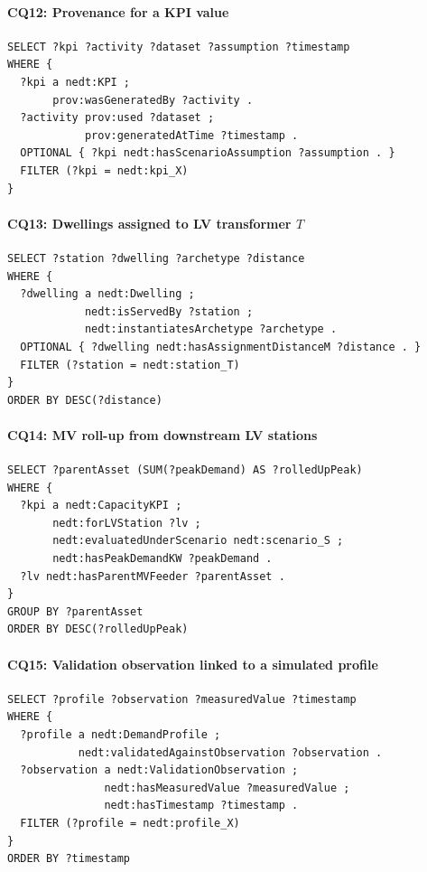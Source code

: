 \documentclass[preprint,12pt]{elsarticle}
\begin{document}
\paragraph{CQ12: Provenance for a KPI value}
\begin{verbatim}
SELECT ?kpi ?activity ?dataset ?assumption ?timestamp
WHERE {
  ?kpi a nedt:KPI ;
       prov:wasGeneratedBy ?activity .
  ?activity prov:used ?dataset ;
            prov:generatedAtTime ?timestamp .
  OPTIONAL { ?kpi nedt:hasScenarioAssumption ?assumption . }
  FILTER (?kpi = nedt:kpi_X)
}
\end{verbatim}

\paragraph{CQ13: Dwellings assigned to LV transformer $T$}
\begin{verbatim}
SELECT ?station ?dwelling ?archetype ?distance
WHERE {
  ?dwelling a nedt:Dwelling ;
            nedt:isServedBy ?station ;
            nedt:instantiatesArchetype ?archetype .
  OPTIONAL { ?dwelling nedt:hasAssignmentDistanceM ?distance . }
  FILTER (?station = nedt:station_T)
}
ORDER BY DESC(?distance)
\end{verbatim}

\paragraph{CQ14: MV roll-up from downstream LV stations}
\begin{verbatim}
SELECT ?parentAsset (SUM(?peakDemand) AS ?rolledUpPeak)
WHERE {
  ?kpi a nedt:CapacityKPI ;
       nedt:forLVStation ?lv ;
       nedt:evaluatedUnderScenario nedt:scenario_S ;
       nedt:hasPeakDemandKW ?peakDemand .
  ?lv nedt:hasParentMVFeeder ?parentAsset .
}
GROUP BY ?parentAsset
ORDER BY DESC(?rolledUpPeak)
\end{verbatim}

\paragraph{CQ15: Validation observation linked to a simulated profile}
\begin{verbatim}
SELECT ?profile ?observation ?measuredValue ?timestamp
WHERE {
  ?profile a nedt:DemandProfile ;
           nedt:validatedAgainstObservation ?observation .
  ?observation a nedt:ValidationObservation ;
               nedt:hasMeasuredValue ?measuredValue ;
               nedt:hasTimestamp ?timestamp .
  FILTER (?profile = nedt:profile_X)
}
ORDER BY ?timestamp
\end{verbatim}
\end{document}
